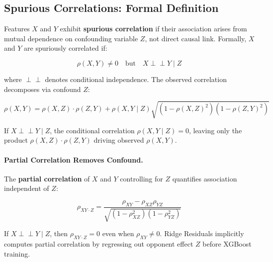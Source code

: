 \subsection{Spurious Correlations: Formal Definition}

Features $X$ and $Y$ exhibit \textbf{spurious correlation} if their association arises from mutual dependence on confounding variable $Z$, not direct causal link. Formally, $X$ and $Y$ are spuriously correlated if:

\begin{equation}
\rho(X, Y) \neq 0 \quad \text{but} \quad X \perp\!\!\!\perp Y \mid Z
\label{eq:spurious-correlation-def}
\end{equation}

where $\perp\!\!\!\perp$ denotes conditional independence. The observed correlation decomposes via confound $Z$:

\begin{equation}
\rho(X, Y) = \rho(X, Z) \cdot \rho(Z, Y) + \rho(X, Y \mid Z) \sqrt{(1 - \rho(X, Z)^2)(1 - \rho(Z, Y)^2)}
\label{eq:spurious-correlation-formula}
\end{equation}

If $X \perp\!\!\!\perp Y \mid Z$, the conditional correlation $\rho(X, Y \mid Z) = 0$, leaving only the product $\rho(X, Z) \cdot \rho(Z, Y)$ driving observed $\rho(X, Y)$.

\paragraph{Partial Correlation Removes Confound.}
The \textbf{partial correlation} of $X$ and $Y$ controlling for $Z$ quantifies association independent of $Z$:

\begin{equation}
\rho_{XY \cdot Z} = \frac{\rho_{XY} - \rho_{XZ} \rho_{YZ}}{\sqrt{(1 - \rho_{XZ}^2)(1 - \rho_{YZ}^2)}}
\label{eq:partial-correlation}
\end{equation}

If $X \perp\!\!\!\perp Y \mid Z$, then $\rho_{XY \cdot Z} = 0$ even when $\rho_{XY} \neq 0$. Ridge Residuals implicitly computes partial correlation by regressing out opponent effect $Z$ before XGBoost training.

